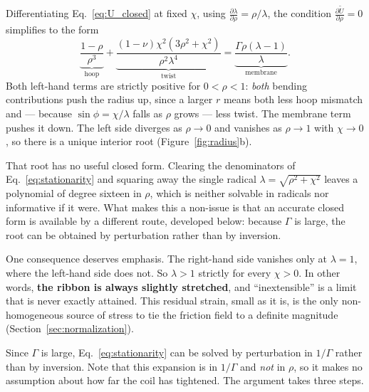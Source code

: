 \documentclass[11pt]{article}
\begin{document}
Differentiating Eq.~\eqref{eq:U_closed} at fixed $\chi$, using
$\frac{\partial \lambda}{\partial \rho} = \rho/\lambda$, the condition
$\frac{\partial \tilde U}{\partial \rho} = 0$ simplifies to the form
\begin{equation}\label{eq:stationarity}
    \boxed{\;
    \underbrace{\frac{1-\rho}{\rho^{3}}}_{\text{hoop}}
    + \underbrace{\frac{\left(1-\nu\right)\chi^{2}
        \left(3\rho^{2}+\chi^{2}\right)}{\rho^{2}\lambda^{4}}}_{\text{twist}}
    = \underbrace{\frac{\Gamma\rho\left(\lambda-1\right)}{\lambda}}
      _{\text{membrane}}.\;}
\end{equation}
Both left-hand terms are strictly positive for $0 < \rho < 1$: \emph{both}
bending contributions push the radius up, since a larger $r$ means both less hoop
mismatch and --- because $\sin\phi = \chi/\lambda$ falls as $\rho$ grows --- less
twist. The membrane term pushes it down. The left side diverges as $\rho \to 0$
and vanishes as $\rho \to 1$ with $\chi \to 0$, so there is a unique interior
root (Figure~\ref{fig:radius}b).

That root has no useful closed form. Clearing the denominators of
Eq.~\eqref{eq:stationarity} and squaring away the single radical
$\lambda = \sqrt{\rho^{2}+\chi^{2}}$ leaves a polynomial of degree sixteen in
$\rho$, which is neither solvable in radicals nor informative if it were. What
makes this a non-issue is that an accurate closed form is available by a
different route, developed below: because $\Gamma$ is large, the root can be
obtained by perturbation rather than by inversion.

One consequence deserves emphasis. The right-hand side vanishes only at
$\lambda = 1$, where the left-hand side does not. So $\lambda > 1$ strictly for
every $\chi > 0$. In other words, \textbf{the ribbon is always slightly stretched}, and ``inextensible'' is a limit that is never exactly attained. This residual strain, small as it is, is the only non-homogeneous source of stress to tie the friction field to a definite magnitude (Section~\ref{sec:normalization}).

Since $\Gamma$ is large, Eq.~\eqref{eq:stationarity} can be solved by
perturbation in $1/\Gamma$ rather than by inversion. Note that this expansion is
in $1/\Gamma$ and \emph{not} in $\rho$, so it makes no assumption about how far
the coil has tightened. The argument takes three steps.
\end{document}
